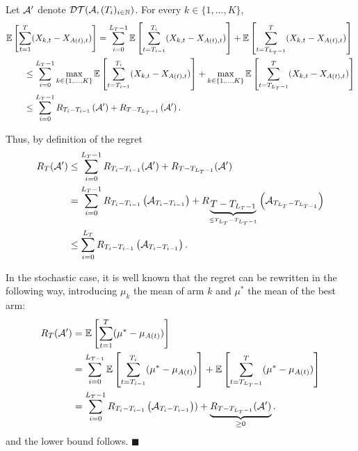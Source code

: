 \documentclass[12pt]{colt2018} %
\begin{document}
    Let $\mathcal{A}'$ denote $\mathcal{DT}(\mathcal{A}, (T_i)_{i\in\mathbb{N}})$. For every $k\in \{1,\dots, K\}$,
    \begin{align*}
        & \mathbb{E}\left[\sum_{t=1}^T (X_{k,t} - X_{A(t),t})\right] = \sum_{i=0}^{L_T -1} \mathbb{E}\left[\sum_{t=T_{i-1}}^{T_i}(X_{k,t} - X_{A(t),t})\right] +  \mathbb{E}\left[ \sum_{t=T_{L_T-1}}^{T}(X_{k,t} - X_{A(t),t})\right] \\
        & \hspace{0.7cm} \leq
        \sum_{i=0}^{L_T -1} \max_{k \in \{1,\dots,K\}}\mathbb{E}\left[\sum_{t=T_{i-1}}^{T_i} (X_{k,t} - X_{A(t),t})\right] + \max_{k \in \{1,\dots,K\}}\mathbb{E}\left[ \sum_{t=T_{L_T-1}}^{T}(X_{k,t} - X_{A(t),t})\right] \\
        & \hspace{0.7cm} \leq
        \sum_{i=0}^{L_T -1}R_{T_i-T_{i-1}}\left(\mathcal{A}'\right) + R_{T - T_{L_T-1}}\left(\mathcal{A}'\right).
    \end{align*}

    Thus, by definition of the regret
    \begin{align*}
        R_T(\mathcal{A}')
        &\leq
        \sum_{i=0}^{L_T-1} R_{T_i - T_{i-1}}(\mathcal{A}')+ R_{T - T_{L_T-1}}(\mathcal{A}') \\
        &=
        \sum_{i=0}^{L_T-1} R_{T_i - T_{i-1}}\left(\mathcal{A}_{T_{i} - T_{i-1}}\right)
        + R_{ \underbrace{T - T_{L_T-1}}_{\leq T_{L_T} - T_{L_T-1}} }\left(\mathcal{A}_{T_{L_T} - T_{L_{T-1}}}\right) \\
        &\leq
        \sum_{i=0}^{L_T} R_{T_i - T_{i-1}}\left(\mathcal{A}_{T_{i} - T_{i-1}}\right).
    \end{align*}

    In the stochastic case, it is well known that the regret can be rewritten in the following way, introducing $\mu_k$ the mean of arm $k$ and $\mu^*$ the mean of the best arm:
    \begin{align*}
        R_T(\mathcal{A}') &=
        \mathbb{E}\left[\sum_{t=1}^{T}(\mu^* - \mu_{A(t)})\right] \\
        &=
        \sum_{i=0}^{L_{T-1}} \mathbb{E}\left[\sum_{t=T_{i-1}}^{T_i}(\mu^* - \mu_{A(t)})\right] + \mathbb{E}\left[\sum_{t=T_{L_T-1}}^{T}(\mu^* - \mu_{A(t)})\right] \\
        &=
        \sum_{i=0}^{L_T-1} R_{T_i - T_{i-1}}\left(\mathcal{A}_{T_i - T_{i-1}}\right)) + \underbrace{R_{T - T_{L_T-1}}(\mathcal{A}')}_{\geq 0}.
    \end{align*}
    and the lower bound follows.
\hfill{}
$\blacksquare$

\newpage
\end{document}
